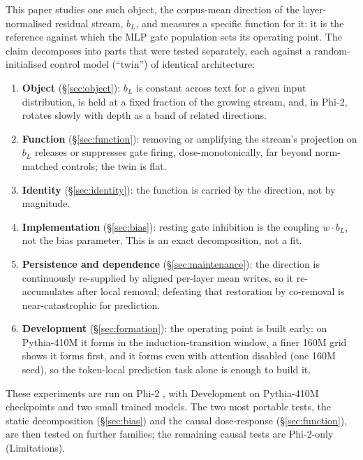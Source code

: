 \documentclass[11pt]{article}
\newcommand{\bl}{b_L}
\begin{document}
This paper studies one such object, the corpus-mean direction of the
layer-normalised residual stream, $\bl$, and measures a specific
function for it: it is the reference against which the MLP gate
population sets its operating point. The claim decomposes into parts
that were tested separately, each against a random-initialised control
model (``twin'') of identical architecture:

\begin{enumerate}
\item \textbf{Object} (\S\ref{sec:object}): $\bl$ is constant across
  text for a given input distribution, is held at a fixed fraction of
  the growing stream, and, in Phi-2, rotates slowly with depth as a band of
  related directions.
\item \textbf{Function} (\S\ref{sec:function}): removing or amplifying
  the stream's projection on $\bl$ releases or suppresses gate firing,
  dose-monotonically, far beyond norm-matched controls; the twin is
  flat.
\item \textbf{Identity} (\S\ref{sec:identity}): the function is
  carried by the direction, not by magnitude.
\item \textbf{Implementation} (\S\ref{sec:bias}): resting gate
  inhibition is the coupling $w\cdot\bl$, not the bias parameter. This
  is an exact decomposition, not a fit.
\item \textbf{Persistence and dependence} (\S\ref{sec:maintenance}):
  the direction is continuously re-supplied by aligned per-layer mean
  writes, so it re-accumulates after local removal; defeating that
  restoration by co-removal is near-catastrophic for prediction.
\item \textbf{Development} (\S\ref{sec:formation}): the operating point
  is built early: on Pythia-410M it forms in the induction-transition
  window, a finer 160M grid shows it forms first, and it forms even with
  attention disabled (one 160M seed), so the token-local prediction task
  alone is enough to build it.
\end{enumerate}

These experiments are run on Phi-2 \citep{abdin2023phi}, with
Development on Pythia-410M \citep{biderman2023} checkpoints and two small
trained models. The two most portable tests, the static decomposition
(\S\ref{sec:bias}) and the causal dose-response (\S\ref{sec:function}),
are then tested on further families; the remaining causal tests are
Phi-2-only (Limitations).
\end{document}
